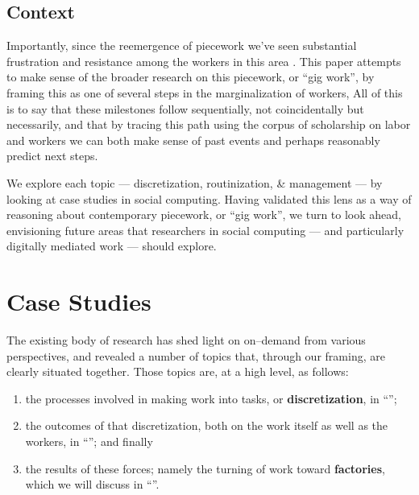 \documentclass{sigchi}
\newcommand{\msb}[1]{{\color{PineGreen}[MSB: #1]}}
\begin{document}
\subsection{Context}
Importantly, since the reemergence of piecework we've seen substantial frustration
and resistance among the workers in this area
\cite{uberAlgorithm,turkopticon,dynamo}.
This paper attempts to make sense of the broader research on this piecework,
or ``gig work'', by framing this as one of several steps in the marginalization of workers,
%
%
%
% 
All of this is to say that these milestones follow sequentially,
not coincidentally but necessarily,
and that by tracing this path using the corpus of scholarship on labor and workers
we can both make sense of past events and perhaps reasonably predict next steps.

We explore each topic
--- discretization, routinization, \& management ---
by looking at case studies in social computing.
Having validated this lens as a way of reasoning about contemporary piecework, or ``gig work'',
we turn to look ahead, envisioning future areas that researchers in social computing
--- and particularly digitally mediated work ---
should explore.  

\section{Case Studies}
The existing body of research has shed light on on--demand from various perspectives,
and revealed a number of topics that,
through our framing, are clearly situated together.
Those topics are, at a high level, as follows:
\begin{enumerate}
\item the processes involved in making work into tasks, or \textbf{discretization},
in ``'';
\item the outcomes of that discretization, both on the work itself as well as the workers,
in ``'';
and finally
\item the results of these forces; namely the turning of work toward \textbf{factories},
which we will discuss in ``''.
\end{enumerate}
\end{document}
